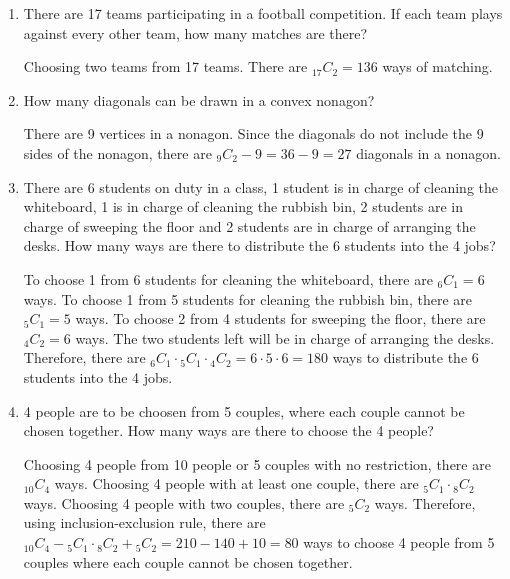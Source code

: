 \documentclass{report}
\newcommand\comb[2][^n]{{}_{#1}C_{#2}}
\begin{document}
\begin{multicols}{2}
\begin{enumerate}
    \item There are 17 teams participating in a football competition. If each team plays
          against every other team, how many matches are there? \sol{}

          Choosing two teams from 17 teams. There are $\comb[17]{2} = 136$ ways of
          matching.

    \item How many diagonals can be drawn in a convex nonagon? \sol{}

          There are 9 vertices in a nonagon. Since the diagonals do not include the 9
          sides of the nonagon, there are $\comb[9]{2} - 9 = 36 - 9 = 27$ diagonals in a
          nonagon.

    \item There are 6 students on duty in a class, 1 student is in charge of cleaning the
          whiteboard, 1 is in charge of cleaning the rubbish bin, 2 students are in
          charge of sweeping the floor and 2 students are in charge of arranging the
          desks. How many ways are there to distribute the 6 students into the 4 jobs?
          \sol{}

          To choose 1 from 6 students for cleaning the whiteboard, there are $\comb[6]{1}
            = 6$ ways. To choose 1 from 5 students for cleaning the rubbish bin, there are
          $\comb[5]{1} = 5$ ways. To choose 2 from 4 students for sweeping the floor,
          there are $\comb[4]{2} = 6$ ways. The two students left will be in charge of
          arranging the desks. Therefore, there are $\comb[6]{1} \cdot \comb[5]{1} \cdot
            \comb[4]{2} = 6 \cdot 5 \cdot 6 = 180$ ways to distribute the 6 students into
          the 4 jobs.

    \item 4 people are to be choosen from 5 couples, where each couple cannot be chosen together. How many ways are there to choose the 4 people?
          \sol{}

          Choosing 4 people from 10 people or 5 couples with no restriction, there are
          $\comb[10]{4}$ ways. Choosing 4 people with at least one couple, there are
          $\comb[5]{1} \cdot \comb[8]{2}$ ways. Choosing 4 people with two couples, there
          are $\comb[5]{2}$ ways. Therefore, using inclusion-exclusion rule, there are
          $\comb[10]{4} - \comb[5]{1} \cdot \comb[8]{2} + \comb[5]{2} = 210 - 140 + 10 =
            80$ ways to choose 4 people from 5 couples where each couple cannot be chosen
          together.


\end{enumerate}
\end{multicols}
\end{document}
